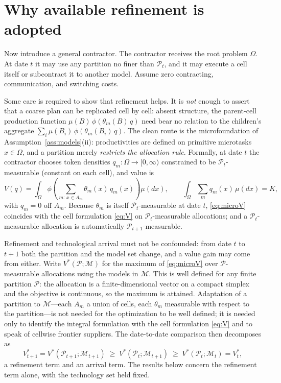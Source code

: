 \documentclass[11pt]{article}
\theoremstyle{definition}
\theoremstyle{remark}
\begin{document}
\section{Why available refinement is adopted}
\label{sec:subdivision}

Now introduce a general contractor. The contractor receives the root problem $\Omega$. At date $t$ it may use any partition no finer than $\mathcal{P}_t$, and it may execute a cell itself or subcontract it to another model. Assume zero contracting, communication, and switching costs.

Some care is required to show that refinement helps. It is \emph{not} enough to assert that a coarse plan can be replicated cell by cell: absent structure, the parent-cell production function $\mu(B)\,\phi(\theta_m(B)\,q)$ need bear no relation to the children's aggregate $\sum_i \mu(B_i)\,\phi(\theta_m(B_i)\,q)$. The clean route is the microfoundation of Assumption~\ref{ass:models}(ii): productivities are defined on primitive microtasks $x \in \Omega$, and a partition merely \emph{restricts the allocation rule}. Formally, at date $t$ the contractor chooses token densities $q_m : \Omega \to [0,\infty)$ constrained to be $\mathcal{P}_t$-measurable (constant on each cell), and value is
\begin{equation}
\label{eq:microV}
V(q) = \int_\Omega \phi\!\left( \sum_{m :\, x \in A_m} \theta_m(x)\, q_m(x) \right) \mu(dx),
\qquad
\int_\Omega \sum_m q_m(x)\, \mu(dx) = K,
\end{equation}
with $q_m = 0$ off $A_m$.
Because $\theta_m$ is itself $\mathcal{P}_t$-measurable at date $t$, \eqref{eq:microV} coincides with the cell formulation \eqref{eq:V} on $\mathcal{P}_t$-measurable allocations; and a $\mathcal{P}_t$-measurable allocation is automatically $\mathcal{P}_{t+1}$-measurable.

Refinement and technological arrival must not be confounded: from date $t$ to $t{+}1$ both the partition and the model set change, and a value gain may come from either. Write $V^*(\mathcal{P}; \mathcal{M})$ for the maximum of \eqref{eq:microV} over $\mathcal{P}$-measurable allocations using the models in $\mathcal{M}$. This is well defined for any finite partition $\mathcal{P}$: the allocation is a finite-dimensional vector on a compact simplex and the objective is continuous, so the maximum is attained. Adaptation of a partition to $\mathcal{M}$---each $A_m$ a union of cells, each $\theta_m$ measurable with respect to the partition---is not needed for the optimization to be well defined; it is needed only to identify the integral formulation with the cell formulation \eqref{eq:V} and to speak of cellwise frontier suppliers. The date-to-date comparison then decomposes as
\begin{equation}
V^*_{t+1} = V^*(\mathcal{P}_{t+1}; \mathcal{M}_{t+1})
\;\ge\; V^*(\mathcal{P}_t; \mathcal{M}_{t+1})
\;\ge\; V^*(\mathcal{P}_t; \mathcal{M}_t) = V^*_t,
\end{equation}
a refinement term and an arrival term. The results below concern the refinement term alone, with the technology set held fixed.
\end{document}

